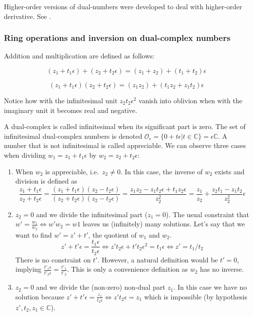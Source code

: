 \documentclass{article}
\newcommand{\C}{\mathbb{C}}
\newcommand{\Z}{\mathcal{O}_\e}
\newcommand{\e}{\epsilon}
\begin{document}
Higher-order versions of dual-numbers were developed to deal with higher-order derivative. See \cite{szi2021, behr2019}.

\subsubsection*{Ring operations and inversion on dual-complex numbers}

Addition and multiplication are defined as follows:

\begin{equation}
(z_1 + t_1 \e) + (z_2 + t_2 \e) = (z_1 + z_2) + (t_1 + t_2) \e
\end{equation}

\noindent \begin{equation}
(z_1 + t_1 \e) (z_2 + t_2 \e) = (z_1 z_2) + (t_1 z_2 + z_1 t_2) \e
\end{equation}

Notice how with the infinitesimal unit $z_2 t_2 \e^2$ vanish into oblivion when with the imaginary unit it becomes real and negative.

A dual-complex is called infinitesimal when its significant part is zero. The set of infinitesimal dual-complex numbers is denoted $\Z = \{0 + t \e | t \in \C\} = \e \C$. A number that is not infinitesimal is called appreciable. We can observe three cases when dividing $w_1 = z_1 + t_1 \e$ by $w_2 = z_2 + t_2 \e$:

\begin{enumerate}
        \item When $w_2$ is appreciable, i.e.\ $z_2 \neq 0$. In this case, the inverse of $w_2$ exists and division is defined as
        \begin{equation}
        \frac{z_1 + t_1 \e}{z_2 + t_2 \e} = \frac{(z_1 + t_1 \e)(z_2 - t_2 \e)}{(z_2 + t_2 \e)(z_2 - t_2 \e)} = \frac{z_1 z_2 - z_1 t_2 \e + t_1 z_2 \e}{z_2^2} = \frac{z_1}{z_2} + \frac{z_2 t_1 - z_1 t_2 }{z_2^2} \e
        \end{equation}
        \item $z_2 = 0$ and we divide the infinitesimal part ($z_1 = 0$). The usual constraint that $w' = \frac{w_1}{w_2} \iff w'w_2 = w1$ leaves us (infinitely) many solutions. Let's say that we want to find $w' = z' + t'$, the quotient of $w_1$ and $w_2$.
        \begin{equation}
        z' + t' \e = \frac{t_1 \e}{t_2 \e} \iff z' t_2 \e + t' t_2 \e^2 = t_1 \e \iff z' = t_1/t_2
        \end{equation}
        There is no constraint on $t'$. However, a natural definition would be $t' = 0$, implying $\frac{t'_1 \e}{t'_2 \e} = \frac{t'_1}{t'_2}$. This is only a convenience definition as $w_2$ has no inverse.
        \item $z_2 = 0$ and we divide the (non-zero) non-dual part $z_1$. In this case we have no solution because $z' + t'\e = \frac{z_1}{t_2 \e} \iff z' t_2 \e = z_1$ which is impossible (by hypothesis $z', t_2, z_1 \in \C$).
\end{enumerate}
\end{document}
